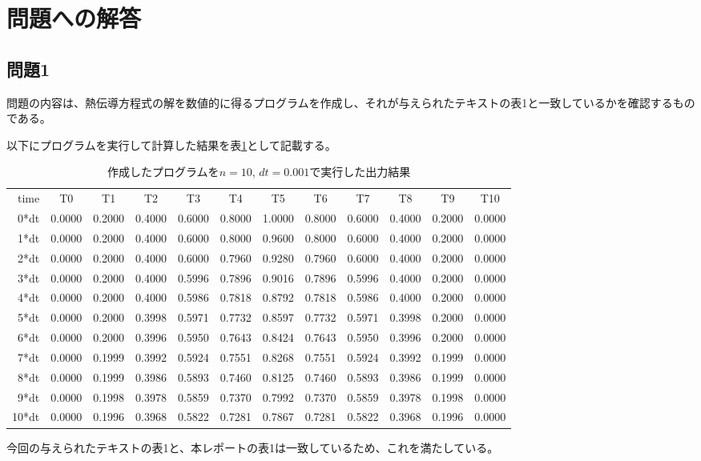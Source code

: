 \documentclass{jsarticle}
\begin{document}
\section{問題への解答}
\subsection{問題1}
問題の内容は、熱伝導方程式の解を数値的に得るプログラムを作成し、それが与えられたテキストの表1と一致しているかを確認するものである。

以下にプログラムを実行して計算した結果を表\ref{tab01}として記載する。
\begin{table}[H]
	\caption[出力結果]{作成したプログラムを$n=10$, $dt=0.001$で実行した出力結果}
	\label{tab01}
	\begin{center}
		\setlength{\tabcolsep}{3pt}
		\footnotesize
		\begin{tabular}{rccccccccccc}
			time & T0 & T1 & T2 & T3 & T4 & T5 & T6 & T7 & T8 & T9 & T10	\\
			0*dt & 0.0000 & 0.2000 & 0.4000 & 0.6000 & 0.8000 & 1.0000 & 0.8000 & 0.6000 & 0.4000 & 0.2000 & 0.0000	\\
			1*dt & 0.0000 & 0.2000 & 0.4000 & 0.6000 & 0.8000 & 0.9600 & 0.8000 & 0.6000 & 0.4000 & 0.2000 & 0.0000	\\
			2*dt & 0.0000 & 0.2000 & 0.4000 & 0.6000 & 0.7960 & 0.9280 & 0.7960 & 0.6000 & 0.4000 & 0.2000 & 0.0000	\\
			3*dt & 0.0000 & 0.2000 & 0.4000 & 0.5996 & 0.7896 & 0.9016 & 0.7896 & 0.5996 & 0.4000 & 0.2000 & 0.0000	\\
			4*dt & 0.0000 & 0.2000 & 0.4000 & 0.5986 & 0.7818 & 0.8792 & 0.7818 & 0.5986 & 0.4000 & 0.2000 & 0.0000	\\
			5*dt & 0.0000 & 0.2000 & 0.3998 & 0.5971 & 0.7732 & 0.8597 & 0.7732 & 0.5971 & 0.3998 & 0.2000 & 0.0000	\\
			6*dt & 0.0000 & 0.2000 & 0.3996 & 0.5950 & 0.7643 & 0.8424 & 0.7643 & 0.5950 & 0.3996 & 0.2000 & 0.0000	\\
			7*dt & 0.0000 & 0.1999 & 0.3992 & 0.5924 & 0.7551 & 0.8268 & 0.7551 & 0.5924 & 0.3992 & 0.1999 & 0.0000	\\
			8*dt & 0.0000 & 0.1999 & 0.3986 & 0.5893 & 0.7460 & 0.8125 & 0.7460 & 0.5893 & 0.3986 & 0.1999 & 0.0000	\\
			9*dt & 0.0000 & 0.1998 & 0.3978 & 0.5859 & 0.7370 & 0.7992 & 0.7370 & 0.5859 & 0.3978 & 0.1998 & 0.0000	\\
			10*dt & 0.0000 & 0.1996 & 0.3968 & 0.5822 & 0.7281 & 0.7867 & 0.7281 & 0.5822 & 0.3968 & 0.1996 & 0.0000	\\
		\end{tabular}
	\end{center}
\end{table}
今回の与えられたテキストの表1と、本レポートの表1は一致しているため、これを満たしている。
\end{document}
